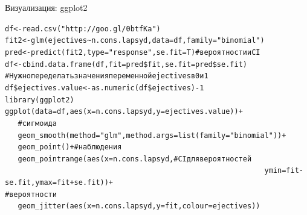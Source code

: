 \begin{frame}{Визуализация: ggplot2}
\scriptsize
\begin{alltt}
df <- read.csv("http://goo.gl/0btfKa")\\
fit2 <- \alert{glm(ejectives \textasciitilde n.cons.lapsyd}, data = df, \alert{family = "binomial")}\medskip\\
pred <- predict(fit2, type="response"{}, se.fit = T) \hfill \# вероятности и CI\\
df <- cbind.data.frame(df, fit = pred\$fit, se.fit = pred\$se.fit)\medskip\\
\# Нужно переделать значения переменной ejectives в 0 и 1\\
df\$ejectives.value <- \alert{as.numeric(}df\$ejectives\alert{) - 1}\medskip\\
library(ggplot2)\\
ggplot(data = df, aes(x = n.cons.lapsyd, y = ejectives.value))+\\
~~~\hfill \# сигмоида \\
~~~geom\_smooth(method = "glm"{}, method.args = list(family = "binomial"))+\\
~~~geom\_point() + \hfill \# наблюдения\\
~~~geom\_pointrange(aes(x = n.cons.lapsyd, \hfill \# CI для вероятностей\\
~~~~~~~~~~~~~~~~~~~~~~~~~~~~~~~~~~~~~~~~~~~~~~~~~~~~~~~~~~~~ymin = fit - se.fit, ymax = fit + se.fit))+\\
\hfill \# вероятности\\
~~~geom\_\alert{jitter}(aes(x = n.cons.lapsyd, y = fit, colour = ejectives)) \\
\end{alltt}
\normalsize
\end{frame}
